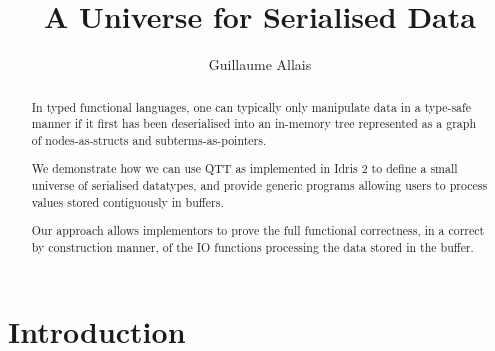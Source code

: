 \documentclass{article}
\title{A Universe for Serialised Data}
\author{Guillaume Allais}
\begin{document}
\maketitle

\begin{abstract}
In typed functional languages, one can typically only manipulate data
in a type-safe manner if it first has been deserialised into an in-memory
tree represented as a graph of nodes-as-structs and subterms-as-pointers.

We demonstrate how we can use QTT as implemented in Idris 2 to define
a small universe of serialised datatypes, and provide generic programs
allowing users to process values stored contiguously in buffers.

Our approach allows implementors to prove the full functional correctness,
in a correct by construction manner, of the IO functions processing the
data stored in the buffer.
\end{abstract}

\section{Introduction}
\end{document}
